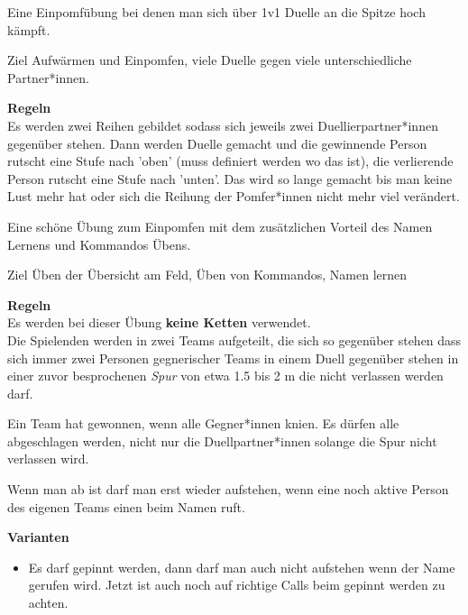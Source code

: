 
Eine Einpomfübung bei denen man sich über 1v1 Duelle an die Spitze hoch kämpft.

\begin{bclogo}[logo=\bcoutil]{Ziel}
Aufwärmen und Einpomfen, viele Duelle gegen viele unterschiedliche Partner*innen.
\end{bclogo}

\textbf{\large Regeln}\\
Es werden zwei Reihen gebildet sodass sich jeweils zwei Duellierpartner*innen gegenüber stehen. Dann werden Duelle gemacht und die gewinnende Person rutscht eine Stufe nach 'oben' (muss definiert werden wo das ist), die verlierende Person rutscht eine Stufe nach 'unten'. Das wird so lange gemacht bis man keine Lust mehr hat oder sich die Reihung der Pomfer*innen nicht mehr viel verändert.


Eine schöne Übung zum Einpomfen mit dem zusätzlichen Vorteil des Namen Lernens und Kommandos Übens.

\begin{bclogo}[logo=\bcoutil]{Ziel}
Üben der Übersicht am Feld, Üben von Kommandos, Namen lernen
\end{bclogo}

\textbf{\large Regeln}\\
Es werden bei dieser Übung \textbf{keine Ketten} verwendet.\\
Die Spielenden werden in zwei Teams aufgeteilt, die sich so gegenüber stehen dass sich immer zwei Personen gegnerischer Teams in einem Duell gegenüber stehen in einer zuvor besprochenen \emph{Spur} von etwa 1.5 bis 2 m die nicht verlassen werden darf.

Ein Team hat gewonnen, wenn alle Gegner*innen knien. Es dürfen alle abgeschlagen werden, nicht nur die Duellpartner*innen solange die Spur nicht verlassen wird.

Wenn man ab ist darf man erst wieder aufstehen, wenn eine noch aktive Person des eigenen Teams einen beim Namen ruft.\\\newline

\textbf{\large Varianten}
\begin{itemize}
    \item Es darf gepinnt werden, dann darf man auch nicht aufstehen wenn der Name gerufen wird. Jetzt ist auch noch auf richtige Calls beim gepinnt werden zu achten.
\end{itemize}


